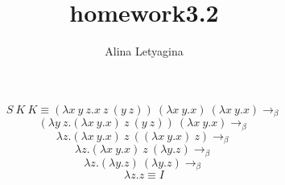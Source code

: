 \documentclass{article}
\title{homework3.2}
\author{Alina Letyagina}
\begin{document}
$$S \ K \ K \equiv (\lambda x\ y\ z.x\ z\ (y\ z))\ (\lambda x\ y.x)\ (\lambda x\ y.x) \rightarrow_\beta$$
$$(\lambda y\ z.(\lambda x\ y.x)\ z\ (y\ z))\ (\lambda x\ y.x) \rightarrow_\beta$$
$$\lambda z.(\lambda x\ y.x)\ z\ ((\lambda x\ y.x)\ z) \rightarrow_\beta$$
$$\lambda z.(\lambda x\ y.x)\ z\ (\lambda y.z) \rightarrow_\beta$$
$$\lambda z.(\lambda y.z)\ (\lambda y.z) \rightarrow_\beta$$
$$\lambda z.z \equiv I$$
\end{document}
